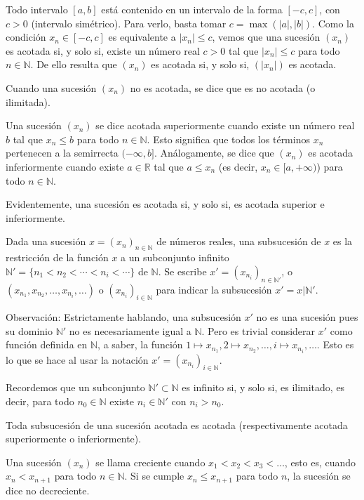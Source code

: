 \documentclass[12pt,oneside]{book}
\begin{document}
Todo intervalo \([a, b]\) está contenido en un intervalo de la forma \([-c, c]\), con \(c > 0\) (intervalo simétrico). Para verlo, basta tomar \(c = \max(|a|, |b|)\). Como la condición \(x_n \in [-c, c]\) es equivalente a \(|x_n| \leq c\), vemos que una sucesión \((x_n)\) es acotada si, y solo si, existe un número real \(c > 0\) tal que \(|x_n| \leq c\) para todo \(n \in \mathbb{N}\). De ello resulta que \((x_n)\) es acotada si, y solo si, \((|x_n|)\) es acotada.

Cuando una sucesión \((x_n)\) no es acotada, se dice que es no acotada (o ilimitada).

Una sucesión \((x_n)\) se dice acotada superiormente cuando existe un número real \(b\) tal que \(x_n \leq b\) para todo \(n \in \mathbb{N}\). Esto significa que todos los términos \(x_n\) pertenecen a la semirrecta \((-\infty, b]\). Análogamente, se dice que \((x_n)\) es acotada inferiormente cuando existe \(a \in \mathbb{R}\) tal que \(a \leq x_n\) (es decir, \(x_n \in [a, +\infty)\)) para todo \(n \in \mathbb{N}\).

Evidentemente, una sucesión es acotada si, y solo si, es acotada superior e inferiormente.

Dada una sucesión \(x = (x_n)_{n \in \mathbb{N}}\) de números reales, una subsucesión de \(x\) es la restricción de la función \(x\) a un subconjunto infinito \(\mathbb{N}' = \{n_1 < n_2 < \cdots < n_i < \cdots\}\) de \(\mathbb{N}\). Se escribe \(x' = (x_{n_i})_{n \in \mathbb{N}'}\), o \((x_{n_1}, x_{n_2}, \ldots, x_{n_i}, \ldots)\) o \((x_{n_i})_{i \in \mathbb{N}}\) para indicar la subsucesión \(x' = x|\mathbb{N}'\).

Observación: Estrictamente hablando, una subsucesión \(x'\) no es una sucesión pues su dominio \(\mathbb{N}'\) no es necesariamente igual a \(\mathbb{N}\). Pero es trivial considerar \(x'\) como función definida en \(\mathbb{N}\), a saber, la función \(1 \mapsto x_{n_1}, 2 \mapsto x_{n_2}, \ldots, i \mapsto x_{n_i}, \ldots\). Esto es lo que se hace al usar la notación \(x' = (x_{n_i})_{i \in \mathbb{N}}\).

Recordemos que un subconjunto \(\mathbb{N}' \subset \mathbb{N}\) es infinito si, y solo si, es ilimitado, es decir, para todo \(n_0 \in \mathbb{N}\) existe \(n_i \in \mathbb{N}'\) con \(n_i > n_0\).

Toda subsucesión de una sucesión acotada es acotada (respectivamente acotada superiormente o inferiormente).

Una sucesión \((x_n)\) se llama creciente cuando \(x_1 < x_2 < x_3 < \ldots\), esto es, cuando \(x_n < x_{n+1}\) para todo \(n \in \mathbb{N}\). Si se cumple \(x_n \leq x_{n+1}\) para todo \(n\), la sucesión se dice no decreciente.
\end{document}

